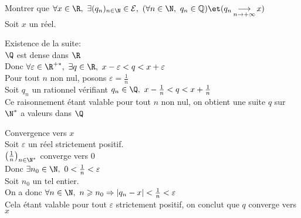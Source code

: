 \documentclass[12pt,twoside,a4paper]{article}
\begin{document}
		\begin{preuve}
			Montrer que $\forall x\in\R,\ \exists (q_n)_{n\in\N}\in\mathcal{E},\ (\forall n\in\N,\ q_n\in\mathbb{Q})\et(q_n\mathop{\longrightarrow}\limits_{n\rightarrow+\infty}x)$\\
			Soit $x$ un r\'eel.
			\begin{liste}
				\item Existence de la suite:\\
					$\Q$ est dense dans $\R$\\
					Donc $\forall \varepsilon\in\R^{+*},\ \exists q\in\R,\ x-\varepsilon<q<x+\varepsilon$\\
					Pour tout $n$ non nul, posons $\varepsilon=\frac1{n}$\\
					Soit $q_n$ un rationnel v\'erifiant $q_n\in\Q,\ x-\frac1{n}<q<x+\frac1{n}$\\
					Ce raisonnement \'etant valable pour tout $n$ non nul, on obtient une suite $q$ sur $\N^*$ a valeurs dans $\Q$
				\item Convergence vers $x$\\
					Soit $\varepsilon$ un r\'eel strictement positif.\\
					$\left(\frac1{n} \right)_{n\in\N^*}$ converge vers $0$\\
					Donc $\exists n_0\in\N,\ 0<\frac1{n}<\varepsilon$\\
					Soit $n_0$ un tel entier.\\
					On a donc $\forall n\in\N,\ n\geqslant n_0\Rightarrow |q_n-x|<\frac1{n}<\varepsilon$\\
					Cela \'etant valable pour tout $\varepsilon$ strictement positif, on conclut que $q$ converge vers $x$
			\end{liste}
		\end{preuve}
\end{document}
